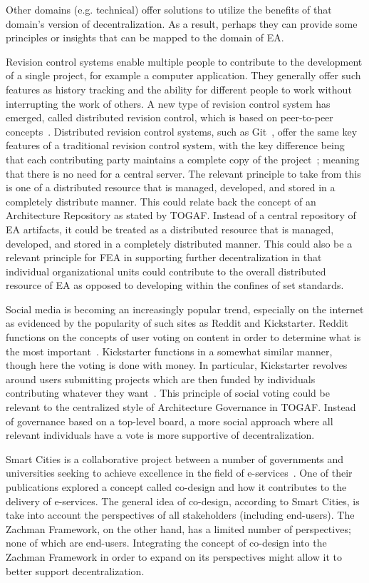Other domains (e.g. technical) offer solutions to utilize the benefits of that domain's version of decentralization. As a result, perhaps they can provide some principles or insights that can be mapped to the domain of EA. 

Revision control systems enable multiple people to contribute to the development of a single project, for example a computer application. They generally offer such features as history tracking and the ability for different people to work without interrupting the work of others. A new type of revision control system has emerged, called distributed revision control, which is based on peer-to-peer concepts~\cite{O'Sullivan2009}. Distributed revision control systems, such as Git~\cite{SoftwareFreedomConservancy}, offer the same key features of a traditional revision control system, with the key difference being that each contributing party maintains a complete copy of the project~\cite{O'Sullivan2009}; meaning that there is no need for a central server. The relevant principle to take from this is one of a distributed resource that is managed, developed, and stored in a completely distribute manner. This could relate back the concept of an Architecture Repository as stated by TOGAF. Instead of a central repository of EA artifacts, it could be treated as a distributed resource that is managed, developed, and stored in a completely distributed manner. This could also be a relevant principle for FEA in supporting further decentralization in that individual organizational units could contribute to the overall distributed resource of EA as opposed to developing within the confines of set standards. 

Social media is becoming an increasingly popular trend, especially on the internet as evidenced by the popularity of such sites as Reddit and Kickstarter. Reddit functions on the concepts of user voting on content in order to determine what is the most important~\cite{RedditInc.}. Kickstarter functions in a somewhat similar manner, though here the voting is done with money. In particular, Kickstarter revolves around users submitting projects which are then funded by individuals contributing whatever they want~\cite{KickstarterInc.}. This principle of social voting could be relevant to the centralized style of Architecture Governance in TOGAF. Instead of governance based on a top-level board, a more social approach where all relevant individuals have a vote is more supportive of decentralization. 

Smart Cities is a collaborative project between a number of governments and universities seeking to achieve excellence in the field of e-services~\cite{Cities}. One of their 
publications explored a concept called co-design and how it contributes to the delivery of e-services. The general idea of co-design, according to Smart Cities, is take into account the perspectives of all stakeholders (including end-users). The Zachman Framework, on the other hand, has a limited number of perspectives; none of which are end-users. Integrating the concept of co-design into the Zachman Framework in order to expand on its perspectives might allow it to better support decentralization. 

